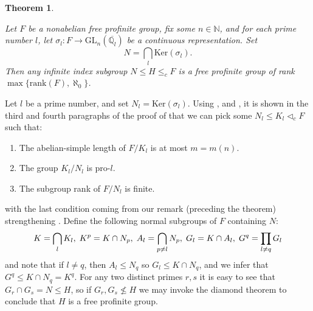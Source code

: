 \documentclass[12pt,a4paper]{article}
\newtheorem{theorem}{Theorem}[section]
\newenvironment{proof}[1][Proof]{\begin{trivlist}
\item[\hskip \labelsep {\bfseries #1}]}{\end{trivlist}}
\begin{document}
\begin{theorem} \label{AdicRepsThm}

Let $F$ be a nonabelian free profinite group, fix some $n \in \mathbb{N}$, and for each prime number $l$, let $\sigma_l \colon F \rightarrow \mathrm{GL}_n(\overline{\mathbb{Q}_{l}})$ be a continuous representation. Set $$N = \bigcap_{l} \mathrm{Ker}(\sigma_l).$$ Then any infinite index subgroup $N \leq H \leq_c F$ is a free profinite group of rank $\max\{\mathrm{rank}(F), \aleph_0\}$.

\end{theorem}

\begin{proof}

Let $l$ be a prime number, and set $N_l = \mathrm{Ker}(\sigma_l)$. Using \newline \cite[Corollary 4.6]{BFW}, and \cite[Lemmas 4.1-4.3]{BFW}, it is shown in the third and fourth paragraphs of the proof of \cite[Theorem 1.2]{BFW} that we can pick some $N_l \leq K_l \lhd_c F$ such that:

\begin{enumerate}

\item The abelian-simple length of $F/K_l$ is at most $m = m(n)$.

\item The group $K_l/N_l$ is pro-$l$.

\item The subgroup rank of $F/N_l$ is finite.

\end{enumerate} with the last condition coming from our remark (preceding the theorem) strengthening \cite[Lemma 4.3]{BFW}. Define the following normal subgroups of $F$ containing $N\colon$ $$K = \bigcap_{l} K_l, \hspace{1mm} K^p = K \cap N_p, \hspace{1mm} A_l = \bigcap_{p \neq l} N_p, \hspace{1mm} G_l = K \cap A_l, \hspace{1mm} G^q = \prod_{l \neq q} G_l $$ and note that if $l \neq q$, then $A_l \leq N_q$ so $G_l \leq K \cap N_q$, and we infer that $G^q \leq K \cap N_q = K^q$. For any two distinct primes $r,s$ it is easy to see that $G_r \cap G_s = N \leq H$, so if $G_r, G_s \nleq H$ we may invoke the diamond theorem to conclude that $H$ is a free profinite group.


\end{proof}
\end{document}
